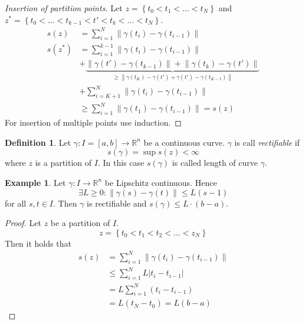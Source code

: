 \documentclass[a4paper,landscape,twocolumn]{article}
\theoremstyle{definition}
\newtheorem{defi}{Definition}
\newtheorem{ex}{Example}
\newcommand\set[1]{\left\{#1\right\}}
\newcommand\abs[1]{\left|#1\right|}
\newcommand\norm[1]{\left\|#1\right\|}
\begin{document}
\begin{proof}[Insertion of partition points]
  Let $z = \set{t_0 < t_1 < \ldots < t_N}$ and $z^* = \set{t_0 < \ldots < t_{k-1} < t' < t_k < \ldots < t_N}$.
  \begin{align*}
    s(z)   &= \sum_{i=1}^N \norm{\gamma(t_i) - \gamma(t_{i-1})} \\
    s(z^*) &= \sum_{i=1}^{k-1} \norm{\gamma(t_i) - \gamma(t_{i-1})} \\
           & + \underbrace{\norm{\gamma(t') - \gamma(t_{k-1})} + \norm{\gamma(t_k) - \gamma(t')}}_{\geq \norm{\gamma(t_K) - \gamma(t') + \gamma(t') - \gamma(t_{K-1})}} \\
           &+ \sum_{i=K+1}^N \norm{\gamma(t_i) - \gamma(t_{i-1})} \\
           &\geq \sum_{i=1}^N \norm{\gamma(t_1) - \gamma(t_{i-1})} = s(z)
  \end{align*}
  For insertion of multiple points use induction.
\end{proof}

\begin{defi}
  Let $\gamma: I = [a,b] \to \mathbb R^n$ be a continuous curve.
  $\gamma$ is call \emph{rectifiable} if
  \[ s(\gamma) = \sup{s(z)} < \infty \]
  where $z$ is a partition of $I$.
  In this case $s(\gamma)$ is called length of curve $\gamma$.
\end{defi}
\begin{ex}
  Let $\gamma: I \to \mathbb R^n$ be Lipschitz continuous.
  Hence
  \[ \exists L \geq 0: \norm{\gamma(s) - \gamma(t)} \leq L(s - 1)  \]
  for all $s,t \in I$. Then $\gamma$ is rectifiable and $s(\gamma) \leq L \cdot (b-a)$.
\end{ex}
\begin{proof}
  Let $z$ be a partition of $I$.
  \[ z = \set{t_0 < t_1 < t_2 < \ldots < z_N} \]
  Then it holds that
  \begin{align*}
    s(z) &= \sum_{i=1}^N \norm{\gamma(t_i) - \gamma(t_{i-1})} \\
         &\leq \sum_{i=1}^N L \abs{t_i - t_{i-1}} \\
         &= L \sum_{i=1}^N (t_i - t_{i-1}) \\
         &= L (t_N - t_0) = L(b - a)
  \end{align*}
\end{proof}
\end{document}
